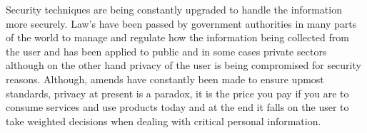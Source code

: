\documentclass[12pt]{article}
\begin{document}
Security techniques are being constantly upgraded to handle the information more securely.  Law's have been passed by government authorities in many parts of the world \cite{oced,ukdp} to manage and regulate how the information being collected from the user and has been applied to public and in some cases private sectors although on the other hand privacy of the user is being compromised for security reasons. Although, amends have constantly been made to ensure upmost standards, privacy at present is a paradox, it is the price you pay if you are to consume services and use products today and at the end it falls on the user to take weighted decisions when dealing with critical personal information.



\end{document}
